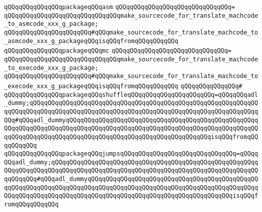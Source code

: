 \newline
\verb|qQQqqQQqqQQqqQQqpackageqQQqasm|\newline
\verb|qQQqqQQqqQQqqQQqqQQqqQQqqQQqqQQq=|\newline
\verb|qQQqqQQqqQQqqQQqqQQqqQQqqQQqqQQqmake_sourcecode_for_translate_machcode_to_asmcode_xxx_g_package;|\newline
\verb|qQQqqQQqqQQqqQQqqQQqqQQq#qQQqmake_sourcecode_for_translate_machcode_to_asmcode_xxx_g_packageqQQqisqQQqfromqQQqqQQqqQQq|\newline
\newline
\verb|qQQqqQQqqQQqqQQqpackageqQQqmc|\newline
\verb|qQQqqQQqqQQqqQQqqQQqqQQqqQQqqQQq=|\newline
\verb|qQQqqQQqqQQqqQQqqQQqqQQqqQQqqQQqmake_sourcecode_for_translate_machcode_to_execode_xxx_g_package;|\newline
\verb|qQQqqQQqqQQqqQQqqQQqqQQq#qQQqmake_sourcecode_for_translate_machcode_to_execode_xxx_g_packageqQQqisqQQqfromqQQqqQQqqQQq|\newline
\verb|qQQqqQQqqQQqqQQq#|\newline
\verb|qQQqqQQqqQQqqQQqpackageqQQqshuffleqQQqqQQqqQQqqQQqqQQqqQQq=qQQqqQQqadl_dummy;qQQqqQQqqQQqqQQqqQQqqQQqqQQqqQQqqQQqqQQqqQQqqQQqqQQqqQQqqQQqqQQqqQQqqQQqqQQqqQQqqQQqqQQqqQQqqQQqqQQqqQQqqQQqqQQqqQQqqQQqqQQqqQQqqQQqqQQq#qQQqadl_dummyqQQqqQQqqQQqqQQqqQQqqQQqqQQqqQQqqQQqqQQqqQQqqQQqqQQqqQQqqQQqqQQqqQQqqQQqqQQqqQQqqQQqqQQqqQQqqQQqqQQqqQQqqQQqqQQqqQQqqQQqqQQqqQQqqQQqqQQqqQQqqQQqqQQqqQQqqQQqqQQqqQQqqQQqqQQqqQQqqQQqisqQQqfromqQQqqQQqqQQq|\newline
\verb|qQQqqQQqqQQqqQQqpackageqQQqjumpsqQQqqQQqqQQqqQQqqQQqqQQqqQQqqQQq=qQQqqQQqadl_dummy;qQQqqQQqqQQqqQQqqQQqqQQqqQQqqQQqqQQqqQQqqQQqqQQqqQQqqQQqqQQqqQQqqQQqqQQqqQQqqQQqqQQqqQQqqQQqqQQqqQQqqQQqqQQqqQQqqQQqqQQqqQQqqQQqqQQqqQQq#qQQqadl_dummyqQQqqQQqqQQqqQQqqQQqqQQqqQQqqQQqqQQqqQQqqQQqqQQqqQQqqQQqqQQqqQQqqQQqqQQqqQQqqQQqqQQqqQQqqQQqqQQqqQQqqQQqqQQqqQQqqQQqqQQqqQQqqQQqqQQqqQQqqQQqqQQqqQQqqQQqqQQqqQQqqQQqqQQqqQQqqQQqqQQqisqQQqfromqQQqqQQqqQQq|\newline

